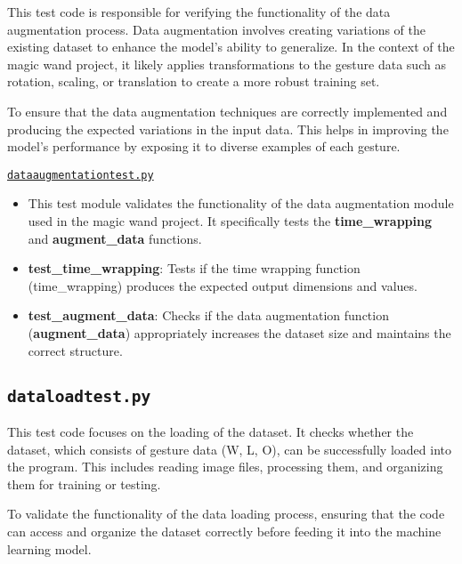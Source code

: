 			This test code is responsible for verifying the functionality of the data augmentation process. Data augmentation involves creating variations of the existing dataset to enhance the model's ability to generalize. In the context of the magic wand project, it likely applies transformations to the gesture data such as rotation, scaling, or translation to create a more robust training set.
			
			To ensure that the data augmentation techniques are correctly implemented and producing the expected variations in the input data. This helps in improving the model's performance by exposing it to diverse examples of each gesture.
			
			\href{../Documents/MagicWand/ML23-06-Magic-Wand-with-an-Arduino-Nano-33-BLE-sense/Sourcecode/Code/Datatraining/Tests/dataaugmentationtest.py}{\texttt{dataaugmentationtest.py}}
		
			\begin{itemize}
				
				\item This test module validates the functionality of the data augmentation module used in the magic wand project. It specifically tests the \textbf{time\_wrapping} and \textbf{augment\_data} functions.
				 
				\item \textbf{test\_time\_wrapping}: Tests if the time wrapping function (time\_wrapping) produces the expected output dimensions and values.
				
				\item \textbf{test\_augment\_data}: Checks if the data augmentation function (\textbf{augment\_data}) appropriately increases the dataset size and maintains the correct structure.
				
			\end{itemize}
	
			\subsection{\texttt{dataloadtest.py}}
			
			This test code focuses on the loading of the dataset. It checks whether the dataset, which consists of gesture data (W, L, O), can be successfully loaded into the program. This includes reading image files, processing them, and organizing them for training or testing.
			
			To validate the functionality of the data loading process, ensuring that the code can access and organize the dataset correctly before feeding it into the machine learning model.
			
